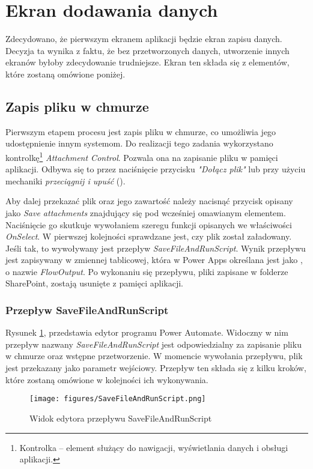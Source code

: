 \section{Ekran dodawania danych}

Zdecydowano, że pierwszym ekranem aplikacji będzie ekran zapisu danych. Decyzja ta wynika z faktu, że bez przetworzonych danych, utworzenie innych ekranów byłoby zdecydowanie trudniejsze. Ekran ten składa się z elementów, które zostaną omówione poniżej.

\subsection{Zapis pliku w chmurze}
Pierwszym etapem procesu jest zapis pliku w chmurze, co umożliwia jego udostępnienie innym systemom. Do realizacji tego zadania wykorzystano kontrolkę\footnote{Kontrolka -- element służący do nawigacji, wyświetlania danych i obsługi aplikacji.} \emph{Attachment Control}. Pozwala ona na zapisanie pliku w pamięci aplikacji. Odbywa się to przez naciśnięcie przycisku \emph{"Dołącz plik"} lub przy użyciu mechaniki \emph{przeciągnij i upuść} (). 

Aby dalej przekazać plik oraz jego zawartość należy nacisnąć przycisk opisany jako \emph{Save attachments} znajdujący się pod wcześniej omawianym elementem. Naciśnięcie go skutkuje wywołaniem szeregu funkcji opisanych we właściwości \emph{OnSelect}. W pierwszej kolejności sprawdzane jest, czy plik został załadowany. Jeśli tak, to wywoływany jest przepływ \emph{SaveFileAndRunScript}. Wynik przepływu jest zapisywany w zmiennej tablicowej, która w Power Apps określana jest jako , o nazwie \emph{FlowOutput}. Po wykonaniu się przepływu, pliki zapisane w folderze SharePoint, zostają usunięte z pamięci aplikacji.



\subsubsection{Przepływ SaveFileAndRunScript}
Rysunek \ref{fig:savefileandrunscript}, przedstawia edytor programu Power Automate. Widoczny w nim przepływ nazwany \emph{SaveFileAndRunScript} jest odpowiedzialny za zapisanie pliku w chmurze oraz wstępne przetworzenie. W momencie wywołania przepływu, plik jest przekazany jako parametr wejściowy. Przepływ ten składa się z kilku kroków, które zostaną omówione w kolejności ich wykonywania.

\begin{figure}[t]
    \centering
    \texttt{[image: figures/SaveFileAndRunScript.png]}
    \caption{Widok edytora przepływu SaveFileAndRunScript}
    \label{fig:savefileandrunscript}
\end{figure}

